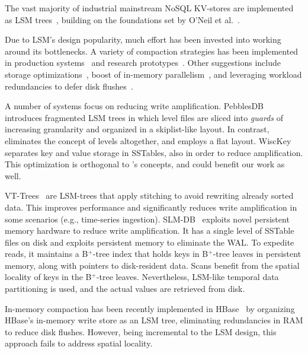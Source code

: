 

The vast majority of industrial mainstream NoSQL KV-stores are  implemented as LSM trees~\cite{hbase, 
RocksDB, scylladb, Bigtable2008, cassandra2010}, building on the foundations set by O'Neil 
et al.~\cite{DBLP:journals/acta/ONeilCGO96, Muth1998}. 

Due to LSM's design popularity, much effort has been invested into working around its bottlenecks.
A variety of compaction strategies has been implemented in production systems~\cite{CallaghanCompaction, 
ScyllaCompaction} and research prototypes~\cite{triad, PebblesDB, vttrees, slmdb}. Other suggestions include storage
optimizations~\cite{WiscKey, PebblesDB, vttrees, slmdb}, boost of in-memory parallelism~\cite{scylladb, clsm2015}, and leveraging 
 workload redundancies to defer disk flushes~\cite{triad, accordion}. 

A number of systems focus on reducing write amplification.
PebblesDB~\cite{PebblesDB} introduces fragmented LSM trees in which level files are 
sliced into {\em guards\/} of increasing granularity and organized in a skiplist-like layout. 
In contrast, \sys\/ eliminates the concept of levels altogether, 
and employs a flat  layout. WiscKey~\cite{WiscKey} separates key and value storage 
in SSTables, also in order to reduce amplification. This optimization is orthogonal to \sys's concepts,
and could benefit our work as well. 

VT-Trees~\cite{vttrees} are LSM-trees that apply stitching to avoid rewriting already sorted data. This improves performance and significantly reduces write amplification 
in some scenarios (e.g., time-series ingestion). 
SLM-DB~\cite{slmdb} exploits novel persistent memory hardware to reduce write amplification.  
It has a single level of SSTable files on disk and 
exploits persistent memory to eliminate the WAL. To expedite reads, it maintains a B$^+$-tree index that holds keys in B$^+$-tree leaves in persistent memory, 
along with pointers to disk-resident data. 
Scans benefit from the spatial locality of keys in the B$^+$-tree leaves. Nevertheless, LSM-like temporal data partitioning is used, and the actual values are retrieved from disk.

In-memory compaction has been recently implemented in HBase~\cite{accordion} by organizing
HBase's in-memory write store  as an LSM tree, eliminating redundancies 
in RAM to reduce disk flushes. However, being incremental to the LSM design, 
this approach fails to address spatial locality. 

